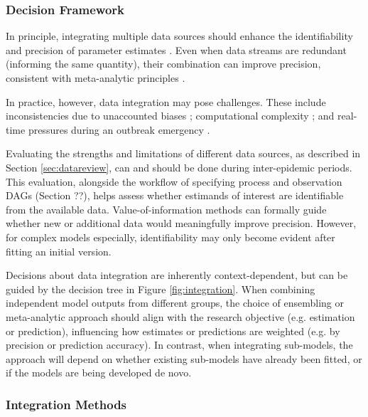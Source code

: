 \documentclass{article}
\begin{document}
\subsubsection{Decision Framework}

In principle, integrating multiple data sources should enhance the identifiability and precision of parameter estimates \citep{deangelis2018analysing, lison2024generative, russell2024combined, birrell2025real}. Even when data streams are redundant (informing the same quantity), their combination can improve precision, consistent with meta-analytic principles \citep{deangelis2018analysing,borenstein2021introduction}. 

In practice, however, data integration may pose challenges. These include inconsistencies due to unaccounted biases \citep{presanis2013conflict,knock2021key, Ward2024-sp, corbella2022inferring}; computational complexity \citep{corbella2022inferring}; and real-time pressures during an outbreak emergency \citep{mccaw2023role}.

Evaluating the strengths and limitations of different data sources, as described in Section \ref{sec:datareview}, can and should be done during inter-epidemic periods. This evaluation, alongside the workflow of specifying process and observation DAGs (Section ??), helps assess whether estimands of interest are identifiable from the available data. Value-of-information methods \citep{jackson2019value,heath2024value} can formally guide whether new or additional data would meaningfully improve precision. However, for complex models especially, identifiability may only become evident after fitting an initial version.

Decisions about data integration are inherently context-dependent, but can be guided by the decision tree in Figure \ref{fig:integration}. When combining independent model outputs from different groups, the choice of ensembling or meta-analytic approach should align with the research objective (e.g. estimation or prediction), influencing how estimates or predictions are weighted (e.g. by precision or prediction accuracy). In contrast, when integrating sub-models, the approach will depend on whether existing sub-models have already been fitted, or if the models are being developed de novo.

\subsubsection{Integration Methods}
\end{document}
